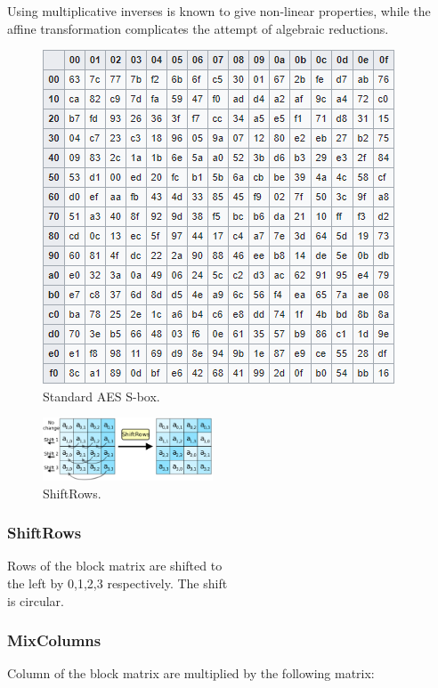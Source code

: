 \documentclass[a4paper, 12pt]{report}
\begin{document}
Using multiplicative inverses is known to give non-linear properties, while the affine transformation complicates the attempt of algebraic reductions.
\vspace{35mm}
\begin{figure}[H]
	\centering
	\includegraphics[scale=0.7]{images/Lec8/sbox1.png}
	\caption{Standard AES S-box.}
	\label{fig:sbox}
\end{figure}

\begin{figure}
	\includegraphics[width=0.45\textwidth]{images/Lec8/ShiftRows.png}
	\caption{ShiftRows.}
	\label{fig:shiftrows}
\end{figure}


\subsubsection{ShiftRows}
Rows of the block matrix are shifted to\\the left by 0,1,2,3 respectively. The shift\\is circular.
\vspace{5mm}
\subsubsection{MixColumns}
Column of the block matrix are multiplied by the following matrix:
\end{document}
